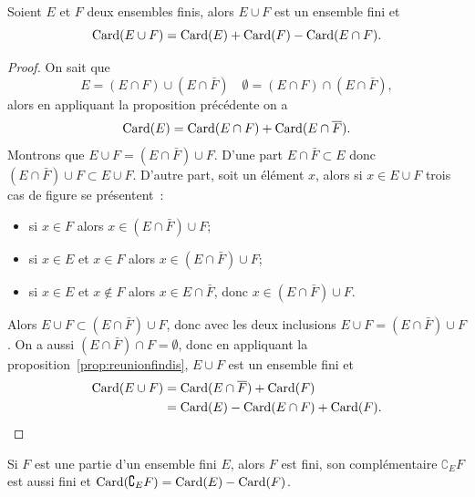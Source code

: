 \begin{prop}
  Soient \(E\) et \(F\) deux ensembles finis, alors \(E\cup F\) est un ensemble 
  fini et
  \begin{equation}
    \operatorname{Card}(E\cup F) = \operatorname{Card}(E) + \operatorname{Card}(F) - \operatorname{Card}(E\cap F).
  \end{equation}
\end{prop}

\begin{proof}
  On sait que
  \begin{equation}
    E = (E\cap F)\cup (E\cap \bar{F}) \quad \emptyset = (E\cap F)\cap (E\cap 
    \bar{F}),
  \end{equation} alors en appliquant la proposition précédente on a
  \begin{equation}
    \operatorname{Card}(E) = \operatorname{Card}(E\cap F)+\operatorname{Card}(E\cap \overline{F}).
  \end{equation}
  Montrons que \(E\cup F =(E\cap \bar{F}) \cup F\). D'une part \(E \cap \bar{F} 
  \subset E\) donc \((E\cap \bar{F}) \cup F \subset E\cup F\). D'autre part, 
  soit un élément \(x\), alors si \(x \in E \cup F\) trois cas de figure se 
  présentent~:
  \begin{itemize}
    \item si \(x\in F\) alors \(x \in (E\cap \bar{F}) \cup F\);
    \item si \(x \in E\) et \(x \in F\) alors \(x \in (E\cap \bar{F}) \cup F\);
    \item si \(x \in E\) et \(x \notin F\) alors \(x \in E\cap \bar{F}\), donc 
      \(x \in (E\cap \bar{F}) \cup F\).
  \end{itemize}
  Alors \(E\cup F \subset (E \cap \bar{F})\cup F\), donc avec les deux 
  inclusions \(E\cup F =(E\cap \bar{F}) \cup F\). On a aussi \((E\cap 
  \bar{F})\cap F = \emptyset\), donc en appliquant la 
  proposition~\ref{prop:reunionfindis}, \(E\cup F\) est un ensemble fini et
  \begin{align}
    \operatorname{Card}(E\cup F)& = \operatorname{Card}(E\cap \overline{F})+\operatorname{Card}(F)\\ & = \operatorname{Card}(E) - \operatorname{Card}(E\cap 
    F)+\operatorname{Card}(F).
  \end{align}
\end{proof}

\begin{prop}
  Si \(F\) est une partie d'un ensemble fini \(E\), alors \(F\) est fini, son 
  complémentaire \(\complement_E F\) est aussi fini et \(\operatorname{Card}(\complement_E F) 
  = \operatorname{Card}(E) - \operatorname{Card}(F)\).
\end{prop}

